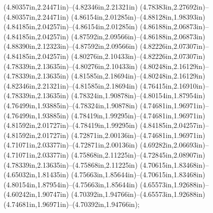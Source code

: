 (4.80357in,2.24471in)--(4.82346in,2.21321in) (4.78383in,2.27692in)--(4.80357in,2.24471in) (4.86154in,2.01285in)--(4.88128in,1.98393in) (4.84185in,2.04257in)--(4.86154in,2.01285in) (4.86188in,2.06873in)--(4.84185in,2.04257in) (4.87592in,2.09566in)--(4.86188in,2.06873in) (4.88390in,2.12323in)--(4.87592in,2.09566in) (4.82226in,2.07307in)--(4.84185in,2.04257in) (4.80276in,2.10433in)--(4.82226in,2.07307in) (4.78339in,2.13635in)--(4.80276in,2.10433in) (4.80248in,2.16129in)--(4.78339in,2.13635in) (4.81585in,2.18694in)--(4.80248in,2.16129in) (4.82346in,2.21321in)--(4.81585in,2.18694in) (4.76415in,2.16910in)--(4.78339in,2.13635in) (4.78324in,1.90878in)--(4.80154in,1.87954in) (4.76499in,1.93885in)--(4.78324in,1.90878in) (4.74681in,1.96971in)--(4.76499in,1.93885in) (4.78419in,1.99295in)--(4.74681in,1.96971in) (4.81592in,2.01727in)--(4.78419in,1.99295in) (4.84185in,2.04257in)--(4.81592in,2.01727in) (4.72871in,2.00136in)--(4.74681in,1.96971in) (4.71071in,2.03377in)--(4.72871in,2.00136in) (4.69282in,2.06693in)--(4.71071in,2.03377in) (4.75868in,2.11225in)--(4.72845in,2.08907in) (4.78339in,2.13635in)--(4.75868in,2.11225in) (4.70615in,1.83468in)--(4.65032in,1.81435in) (4.75663in,1.85644in)--(4.70615in,1.83468in) (4.80154in,1.87954in)--(4.75663in,1.85644in) (4.65573in,1.92688in)--(4.60242in,1.90747in) (4.70392in,1.94766in)--(4.65573in,1.92688in) (4.74681in,1.96971in)--(4.70392in,1.94766in);
